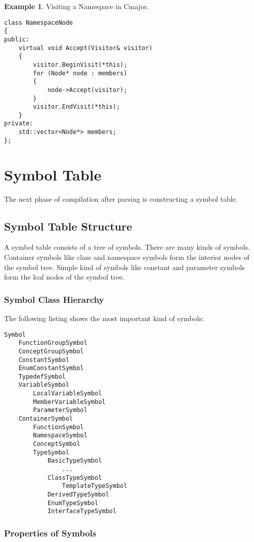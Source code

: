\documentclass[a4paper,oneside,11pt]{book}
\theoremstyle{definition}
\newtheorem{exmp}{Example}[section]
\begin{document}
\begin{exmp} Visiting a Namespace in Cmajor.
\lstset{language=C++}
\begin{lstlisting}
class NamespaceNode
{
public:
    virtual void Accept(Visitor& visitor)
    {
        visitor.BeginVisit(*this);
        for (Node* node : members)
        {
            node->Accept(visitor);
        }
        visitor.EndVisit(*this);
    }
private:
    std::vector<Node*> members;
};

\end{lstlisting}
\end{exmp}

\chapter{Symbol Table}

The next phase of compilation after parsing is constructing a symbol table.

\section{Symbol Table Structure}

A symbol table consists of a tree of symbols.
There are many kinds of symbols.
Container symbols like class and namespace symbols form the interior nodes of the symbol tree.
Simple kind of symbols like constant and parameter symbols form the leaf nodes of the symbol tree.

\subsection{Symbol Class Hierarchy}

The following listing shows the most important kind of symbols:

\begin{verbatim}
Symbol
    FunctionGroupSymbol
    ConceptGroupSymbol
    ConstantSymbol
    EnumConstantSymbol
    TypedefSymbol
    VariableSymbol
        LocalVariableSymbol
        MemberVariableSymbol
        ParameterSymbol
    ContainerSymbol
        FunctionSymbol
        NamespaceSymbol
        ConceptSymbol
        TypeSymbol
            BasicTypeSymbol
                ...
            ClassTypeSymbol
                TemplateTypeSymbol
            DerivedTypeSymbol
            EnumTypeSymbol
            InterfaceTypeSymbol
\end{verbatim}

\subsection{Properties of Symbols}
\end{document}
